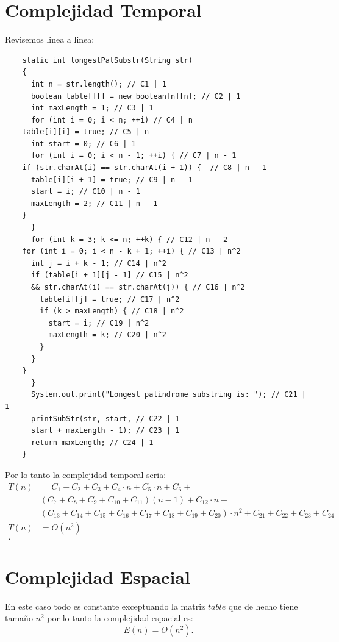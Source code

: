 \documentclass{report}
\begin{document}
		       \section{Complejidad Temporal}

		       Revisemos linea a linea:
		       \begin{verbatim}
    static int longestPalSubstr(String str)
    {
      int n = str.length(); // C1 | 1
      boolean table[][] = new boolean[n][n]; // C2 | 1
      int maxLength = 1; // C3 | 1
      for (int i = 0; i < n; ++i) // C4 | n
	table[i][i] = true; // C5 | n
      int start = 0; // C6 | 1
      for (int i = 0; i < n - 1; ++i) { // C7 | n - 1
	if (str.charAt(i) == str.charAt(i + 1)) {  // C8 | n - 1
	  table[i][i + 1] = true; // C9 | n - 1
	  start = i; // C10 | n - 1
	  maxLength = 2; // C11 | n - 1
	}
      }
      for (int k = 3; k <= n; ++k) { // C12 | n - 2
	for (int i = 0; i < n - k + 1; ++i) { // C13 | n^2
	  int j = i + k - 1; // C14 | n^2
	  if (table[i + 1][j - 1] // C15 | n^2
	  && str.charAt(i) == str.charAt(j)) { // C16 | n^2
	    table[i][j] = true; // C17 | n^2
	    if (k > maxLength) { // C18 | n^2
	      start = i; // C19 | n^2
	      maxLength = k; // C20 | n^2
	    }
	  }
	}
      }
      System.out.print("Longest palindrome substring is: "); // C21 | 1
      printSubStr(str, start, // C22 | 1
      start + maxLength - 1); // C23 | 1
      return maxLength; // C24 | 1
    }
		       \end{verbatim}

		       Por lo tanto la complejidad temporal seria:
		       \begin{align*}
			 T\left( n \right) &= C_1 + C_2 + C_3 + C_4\cdot n + C_5\cdot n + C_6 + \\
					   &\left( C_7 + C_8 + C_9 + C_{10} + C_{11} \right)  \left( n - 1 \right) + C_{12} \cdot n + \\
					   &\left( C_{13} + C_{14} + C_{15} + C_{16} + C_{17} + C_{18} + C_{19} + C_{20} \right)\cdot n^2 + C_{21} + C_{22} + C_{23} + C_{24} \\
			 T\left( n \right)  &= O\left( n^2 \right)  \\
		       .\end{align*}

		       \section{Complejidad Espacial}

		       En este caso todo es constante exceptuando la matriz $table$ que de hecho tiene tamaño  $n^2$ por lo tanto la complejidad espacial es: \[
			 E\left( n \right) = O\left( n^2 \right) 
		       .\] 
\end{document}
